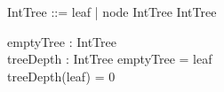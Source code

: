 \documentclass[a4paper,10pt,fleqn]{article}
\begin{document}
\begin{zed}
IntTree ::= leaf | node \ldata \nat \cross IntTree \cross IntTree \rdata
\end{zed}

\begin{axdef}
emptyTree : IntTree \\
treeDepth : IntTree \fun \nat
\where
emptyTree = leaf \\
treeDepth(leaf) = 0
\end{axdef}
\end{document}

